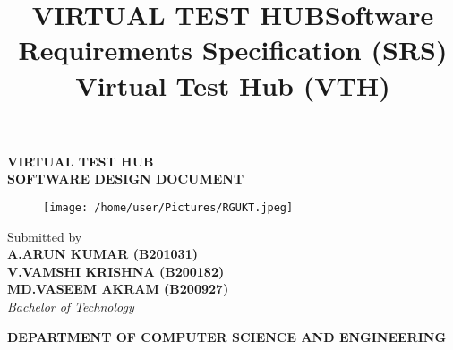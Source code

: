 \documentclass{article}
\title{VIRTUAL TEST HUB}
\author{}
\date{}
\begin{document}
	
	
		\centering
		\vspace*{0.2in}
		
		\Huge \textbf{VIRTUAL TEST HUB}\\
		
		\vspace{0.3in}
		\LARGE \textbf{SOFTWARE DESIGN DOCUMENT}\\
		
		\vspace{0.5in}
		
		\begin{figure}[h!]
			\centering
			\texttt{[image: /home/user/Pictures/RGUKT.jpeg]} %
		\end{figure}
		
		\large Submitted by \\
		
		\vspace{0.3in}
		\textbf{A.ARUN KUMAR (B201031)} \\
		\textbf{V.VAMSHI KRISHNA (B200182)} \\
		\textbf{MD.VASEEM AKRAM (B200927)} \\
		
		\vspace{0.5in}
		\Large \textit{Bachelor of Technology}\\
		
		\vspace{0.2in}
		
		
		
		\vfill
		
		\textbf{DEPARTMENT OF COMPUTER SCIENCE AND ENGINEERING}\\
		\vspace{0.2in}
		
	\title{Software Requirements Specification (SRS)\\ Virtual Test Hub (VTH)}
	\author{}
	\date{}
	
	\newpage
	
	 
	
	
\end{document}

